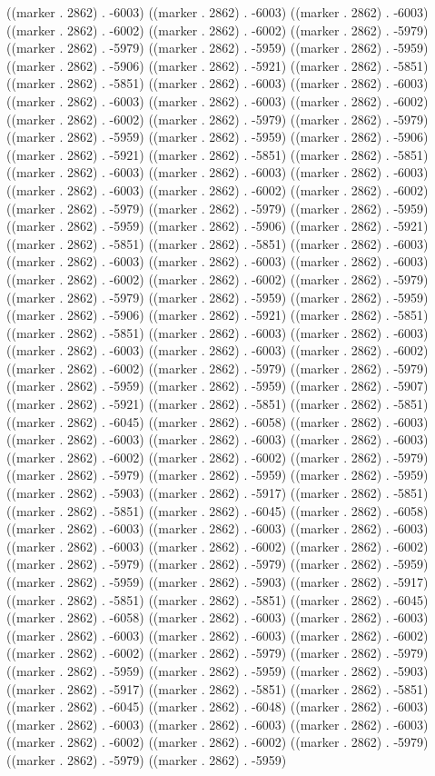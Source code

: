 ((marker . 2862) . -6003) ((marker . 2862) . -6003) ((marker . 2862) . -6003) ((marker . 2862) . -6002) ((marker . 2862) . -6002) ((marker . 2862) . -5979) ((marker . 2862) . -5979) ((marker . 2862) . -5959) ((marker . 2862) . -5959) ((marker . 2862) . -5906) ((marker . 2862) . -5921) ((marker . 2862) . -5851) ((marker . 2862) . -5851) ((marker . 2862) . -6003) ((marker . 2862) . -6003) ((marker . 2862) . -6003) ((marker . 2862) . -6003) ((marker . 2862) . -6002) ((marker . 2862) . -6002) ((marker . 2862) . -5979) ((marker . 2862) . -5979) ((marker . 2862) . -5959) ((marker . 2862) . -5959) ((marker . 2862) . -5906) ((marker . 2862) . -5921) ((marker . 2862) . -5851) ((marker . 2862) . -5851) ((marker . 2862) . -6003) ((marker . 2862) . -6003) ((marker . 2862) . -6003) ((marker . 2862) . -6003) ((marker . 2862) . -6002) ((marker . 2862) . -6002) ((marker . 2862) . -5979) ((marker . 2862) . -5979) ((marker . 2862) . -5959) ((marker . 2862) . -5959) ((marker . 2862) . -5906) ((marker . 2862) . -5921) ((marker . 2862) . -5851) ((marker . 2862) . -5851) ((marker . 2862) . -6003) ((marker . 2862) . -6003) ((marker . 2862) . -6003) ((marker . 2862) . -6003) ((marker . 2862) . -6002) ((marker . 2862) . -6002) ((marker . 2862) . -5979) ((marker . 2862) . -5979) ((marker . 2862) . -5959) ((marker . 2862) . -5959) ((marker . 2862) . -5906) ((marker . 2862) . -5921) ((marker . 2862) . -5851) ((marker . 2862) . -5851) ((marker . 2862) . -6003) ((marker . 2862) . -6003) ((marker . 2862) . -6003) ((marker . 2862) . -6003) ((marker . 2862) . -6002) ((marker . 2862) . -6002) ((marker . 2862) . -5979) ((marker . 2862) . -5979) ((marker . 2862) . -5959) ((marker . 2862) . -5959) ((marker . 2862) . -5907) ((marker . 2862) . -5921) ((marker . 2862) . -5851) ((marker . 2862) . -5851) ((marker . 2862) . -6045) ((marker . 2862) . -6058) ((marker . 2862) . -6003) ((marker . 2862) . -6003) ((marker . 2862) . -6003) ((marker . 2862) . -6003) ((marker . 2862) . -6002) ((marker . 2862) . -6002) ((marker . 2862) . -5979) ((marker . 2862) . -5979) ((marker . 2862) . -5959) ((marker . 2862) . -5959) ((marker . 2862) . -5903) ((marker . 2862) . -5917) ((marker . 2862) . -5851) ((marker . 2862) . -5851) ((marker . 2862) . -6045) ((marker . 2862) . -6058) ((marker . 2862) . -6003) ((marker . 2862) . -6003) ((marker . 2862) . -6003) ((marker . 2862) . -6003) ((marker . 2862) . -6002) ((marker . 2862) . -6002) ((marker . 2862) . -5979) ((marker . 2862) . -5979) ((marker . 2862) . -5959) ((marker . 2862) . -5959) ((marker . 2862) . -5903) ((marker . 2862) . -5917) ((marker . 2862) . -5851) ((marker . 2862) . -5851) ((marker . 2862) . -6045) ((marker . 2862) . -6058) ((marker . 2862) . -6003) ((marker . 2862) . -6003) ((marker . 2862) . -6003) ((marker . 2862) . -6003) ((marker . 2862) . -6002) ((marker . 2862) . -6002) ((marker . 2862) . -5979) ((marker . 2862) . -5979) ((marker . 2862) . -5959) ((marker . 2862) . -5959) ((marker . 2862) . -5903) ((marker . 2862) . -5917) ((marker . 2862) . -5851) ((marker . 2862) . -5851) ((marker . 2862) . -6045) ((marker . 2862) . -6048) ((marker . 2862) . -6003) ((marker . 2862) . -6003) ((marker . 2862) . -6003) ((marker . 2862) . -6003) ((marker . 2862) . -6002) ((marker . 2862) . -6002) ((marker . 2862) . -5979) ((marker . 2862) . -5979) ((marker . 2862) . -5959) 